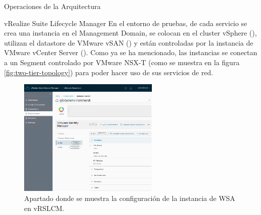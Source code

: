 \begin{subsection}{Operaciones de la Arquitectura}
\begin{subsubsection}{vRealize Suite Lifecycle Manager}
        En el entorno de pruebas, de cada servicio se crea una instancia en el Management Domain, se colocan en el cluster vSphere (), utilizan el datastore de VMware vSAN () y están controladas por la instancia de VMware vCenter Server (). Como ya se ha mencionado, las instancias se conectan a un Segment controlado por VMware NSX-T (como se muestra en la figura \ref{fig:two-tier-topology}) para poder hacer uso de sus servicios de red.
        \begin{figure}[h]
            \centering
            \includegraphics[width=0.6\textwidth]{imaxes/pruebaconcepto/vrealize/config-istance-vridm.png}
            \caption{Apartado donde se muestra la configuración de la instancia de WSA en vRSLCM.}
            \label{fig:config-WSA}
        \end{figure}
        \FloatBarrier 
        


        
    \end{subsubsection}


\end{subsection}
